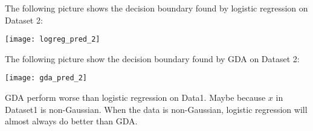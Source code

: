 \begin{answer}
\graphicspath{ {./linearclass/} }

The following picture shows the decision boundary found by logistic regression on Dataset 2:

\texttt{[image: logreg\_pred\_2]}

The following picture show the decision boundary found by GDA on Dataset 2:

\texttt{[image: gda\_pred\_2]}


GDA perform worse than logistic regression on Data1. Maybe because $x$ in Dataset1 is non-Gaussian. When the data is non-Gaussian,  logistic regression will
almost always do better than GDA.
\end{answer}
